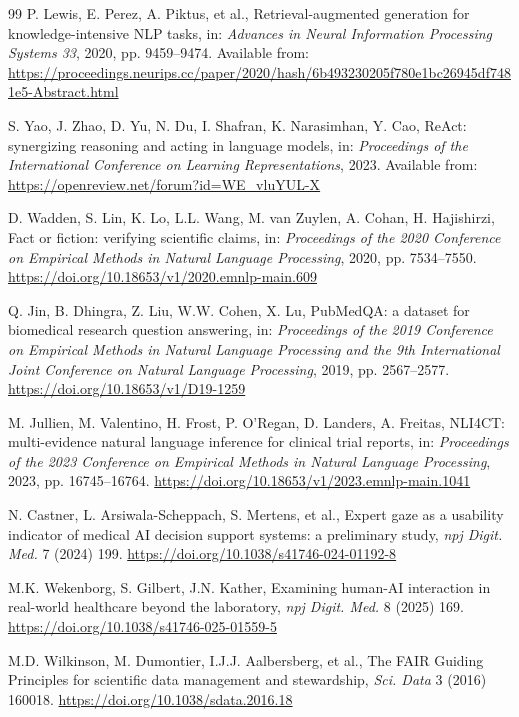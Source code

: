 \documentclass[11pt,a4paper]{article}
\begin{document}
\begin{thebibliography}{99}
P. Lewis, E. Perez, A. Piktus, et al., Retrieval-augmented generation for knowledge-intensive NLP tasks, in: \emph{Advances in Neural Information Processing Systems 33}, 2020, pp. 9459--9474. Available from: \url{https://proceedings.neurips.cc/paper/2020/hash/6b493230205f780e1bc26945df7481e5-Abstract.html}

S. Yao, J. Zhao, D. Yu, N. Du, I. Shafran, K. Narasimhan, Y. Cao, ReAct: synergizing reasoning and acting in language models, in: \emph{Proceedings of the International Conference on Learning Representations}, 2023. Available from: \url{https://openreview.net/forum?id=WE_vluYUL-X}

D. Wadden, S. Lin, K. Lo, L.L. Wang, M. van Zuylen, A. Cohan, H. Hajishirzi, Fact or fiction: verifying scientific claims, in: \emph{Proceedings of the 2020 Conference on Empirical Methods in Natural Language Processing}, 2020, pp. 7534--7550. \url{https://doi.org/10.18653/v1/2020.emnlp-main.609}

Q. Jin, B. Dhingra, Z. Liu, W.W. Cohen, X. Lu, PubMedQA: a dataset for biomedical research question answering, in: \emph{Proceedings of the 2019 Conference on Empirical Methods in Natural Language Processing and the 9th International Joint Conference on Natural Language Processing}, 2019, pp. 2567--2577. \url{https://doi.org/10.18653/v1/D19-1259}

M. Jullien, M. Valentino, H. Frost, P. O'Regan, D. Landers, A. Freitas, NLI4CT: multi-evidence natural language inference for clinical trial reports, in: \emph{Proceedings of the 2023 Conference on Empirical Methods in Natural Language Processing}, 2023, pp. 16745--16764. \url{https://doi.org/10.18653/v1/2023.emnlp-main.1041}

N. Castner, L. Arsiwala-Scheppach, S. Mertens, et al., Expert gaze as a usability indicator of medical AI decision support systems: a preliminary study, \emph{npj Digit. Med.} 7 (2024) 199. \url{https://doi.org/10.1038/s41746-024-01192-8}

M.K. Wekenborg, S. Gilbert, J.N. Kather, Examining human-AI interaction in real-world healthcare beyond the laboratory, \emph{npj Digit. Med.} 8 (2025) 169. \url{https://doi.org/10.1038/s41746-025-01559-5}

M.D. Wilkinson, M. Dumontier, I.J.J. Aalbersberg, et al., The FAIR Guiding Principles for scientific data management and stewardship, \emph{Sci. Data} 3 (2016) 160018. \url{https://doi.org/10.1038/sdata.2016.18}


\end{thebibliography}
\end{document}
